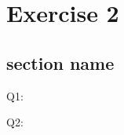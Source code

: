 \graphicspath{{Chapters/Exercise2/}}

\chapter{Exercise 2}

\section{section name} %
\label{sec:section_name}


Q1: 


Q2: 


